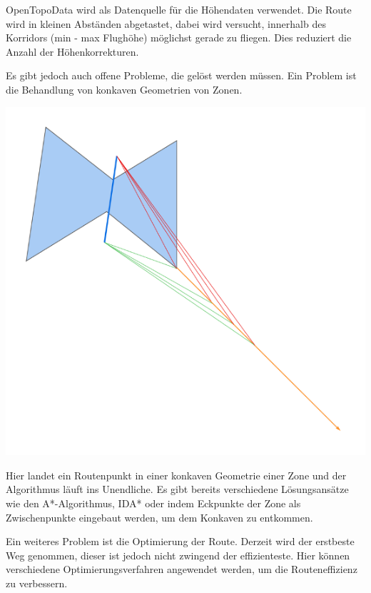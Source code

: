 OpenTopoData wird als Datenquelle für die Höhendaten verwendet. Die Route wird in kleinen Abständen abgetastet, dabei wird versucht, innerhalb des Korridors (min - max Flughöhe) möglichst gerade zu fliegen. Dies reduziert die Anzahl der Höhenkorrekturen.

Es gibt jedoch auch offene Probleme, die gelöst werden müssen. Ein Problem ist die Behandlung von konkaven Geometrien von Zonen.

\begin{center}
    \includegraphics[width=\columnwidth]{images/konkaves-problem}
\end{center}

Hier landet ein Routenpunkt in einer konkaven Geometrie einer Zone und der Algorithmus läuft ins Unendliche. Es gibt bereits verschiedene Lösungsansätze wie den A*-Algorithmus, IDA* oder indem Eckpunkte der Zone als Zwischenpunkte eingebaut werden, um dem Konkaven zu entkommen.

Ein weiteres Problem ist die Optimierung der Route. Derzeit wird der erstbeste Weg genommen, dieser ist jedoch nicht zwingend der effizienteste. Hier können verschiedene Optimierungsverfahren angewendet werden, um die Routeneffizienz zu verbessern.


